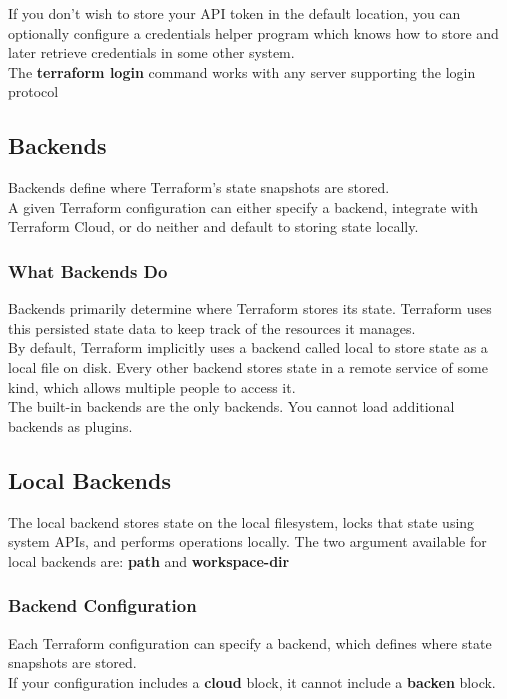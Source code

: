 \documentclass[12pt, letterpaper, twoside]{article}
\begin{document}
If you don't wish to store your API token in the default location, you can optionally configure a 
credentials helper program which knows how to store and later retrieve credentials in some other system.\\

The \textbf{terraform login} command works with any server supporting the login protocol

\subsection{Backends}
Backends define where Terraform's state snapshots are stored.\\
A given Terraform configuration can either specify a backend, integrate with Terraform Cloud, or 
do neither and default to storing state locally.

\subsubsection{What Backends Do}
Backends primarily determine where Terraform stores its state. Terraform uses this persisted state data 
to keep track of the resources it manages.\\
By default, Terraform implicitly uses a backend called local to store state as a local file on disk. 
Every other backend stores state in a remote service of some kind, which allows multiple people to access it.\\

The built-in backends are the only backends. You cannot load additional backends as plugins.

\subsection{Local Backends}
The local backend stores state on the local filesystem, locks that state using system APIs, 
and performs operations locally.
The two argument available for local backends are: \textbf{path} and \textbf{workspace-dir}

\subsubsection{Backend Configuration}
Each Terraform configuration can specify a backend, which defines where state snapshots are stored.\\
If your configuration includes a \textbf{cloud} block, it cannot include a \textbf{backen} block.
\end{document}
